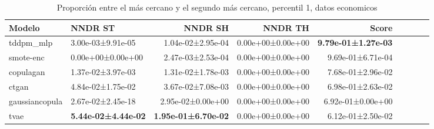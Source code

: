 \begin{table}[H]
\centering
\fontsize{10}{14}\selectfont
\caption{Proporción entre el más cercano y el segundo más cercano, percentil 1, datos economicos}
\label{table-nndr-economicos-a-1th}
\begin{tabular}{|l|l|r|r|r|r|r|r|r|}
\hline
\rowcolor[gray]{0.8}
Modelo & NNDR ST & NNDR SH & NNDR TH & \textbf{Score} \\
\hline tddpm\_mlp & 3.00e-03±9.91e-05 & 1.04e-02±2.95e-04 & 0.00e+00±0.00e+00 & \bfseries 9.79e-01±1.27e-03 \\
\hline smote-enc & \cellcolor[rgb]{0.9, 0.54, 0.52} 0.00e+00±0.00e+00 & \cellcolor[rgb]{0.9, 0.54, 0.52} 2.47e-03±2.53e-04 & 0.00e+00±0.00e+00 & 9.69e-01±6.71e-04 \\
\hline copulagan & 1.37e-02±3.97e-03 & 1.31e-02±1.78e-03 & 0.00e+00±0.00e+00 & 7.68e-01±2.96e-02 \\
\hline ctgan & 4.84e-02±1.75e-02 & 3.67e-02±7.08e-03 & 0.00e+00±0.00e+00 & 6.98e-01±2.63e-02 \\
\hline gaussiancopula & 2.67e-02±2.45e-18 & 2.95e-02±0.00e+00 & 0.00e+00±0.00e+00 & 6.92e-01±0.00e+00 \\
\hline tvae & \bfseries 5.44e-02±4.44e-02 & \bfseries 1.95e-01±6.70e-02 & 0.00e+00±0.00e+00 & \cellcolor[rgb]{0.9, 0.54, 0.52} 6.12e-01±2.50e-02 \\
\hline
\end{tabular}
\end{table}
